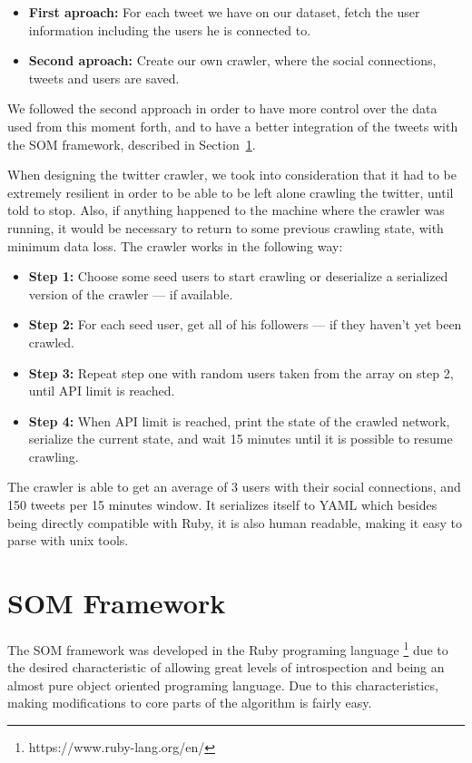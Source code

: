 \begin{itemize}
  \item \textbf{First aproach: } For each tweet we have on our dataset, fetch the user information including the users he is connected to.
  \item \textbf{Second aproach: } Create our own crawler, where the social connections, tweets and users are saved.
\end{itemize}                                                                                             
We followed the second approach in order to have more control over the data used from this moment forth, and to have a better integration of the tweets with the \ac{SOM} framework, described in Section~\ref{sec:som_framework}.

When designing the twitter crawler, we took into consideration that it had to be extremely resilient in order to be able to be left alone crawling the twitter, until told to stop. Also, if anything happened to the machine where the crawler was running, it would be necessary to return to some previous crawling state, with minimum data loss. The crawler works in the following way:

\begin{itemize}
  \item \textbf{Step 1:} Choose some seed users to start crawling or deserialize a serialized version of the crawler --- if available.
  \item \textbf{Step 2:} For each seed user, get all of his followers --- if they haven't yet been crawled.
  \item \textbf{Step 3:} Repeat step one with random users taken from the array on step 2, until API limit is reached.
  \item \textbf{Step 4:} When API limit is reached, print the state of the crawled network, serialize the current state, and wait 15 minutes until it is possible to resume crawling. 
\end{itemize}

The crawler is able to get an average of 3 users with their social connections, and 150 tweets per 15 minutes window. It serializes itself to \ac{YAML} which besides being directly compatible with Ruby, it is also human readable, making it easy to parse with unix tools.


\section{SOM Framework}
\label{sec:som_framework}
The \ac{SOM} framework was developed in the Ruby programing language \footnote{https://www.ruby-lang.org/en/} due to the desired characteristic of allowing great levels of introspection and being an almost pure object oriented programing language. Due to this characteristics, making modifications to core parts of the algorithm is fairly easy.

